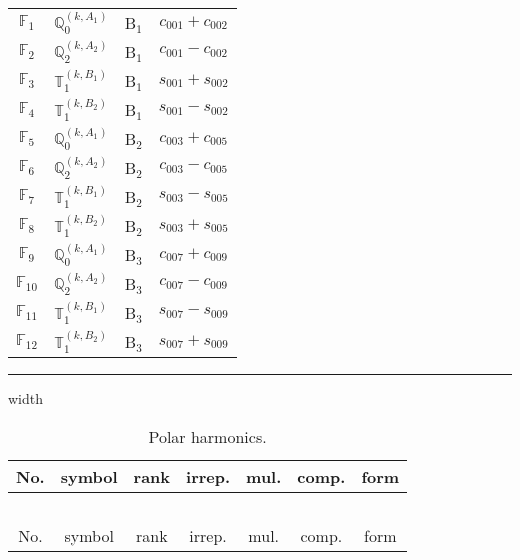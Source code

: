 \documentclass[fleqn,10pt,landscape]{article}
\begin{document}
\begin{itemize}
\begin{center}
\begin{longtable}{c|c|c|c}
$ \mathbb{F}_{1} $ & $\mathbb{Q}_{0}^{(k,A_{1})}$ & B$_{1}$ & $c_{001} + c_{002}$ \\
$ \mathbb{F}_{2} $ & $\mathbb{Q}_{2}^{(k,A_{2})}$ & B$_{1}$ & $c_{001} - c_{002}$ \\
$ \mathbb{F}_{3} $ & $\mathbb{T}_{1}^{(k,B_{1})}$ & B$_{1}$ & $s_{001} + s_{002}$ \\
$ \mathbb{F}_{4} $ & $\mathbb{T}_{1}^{(k,B_{2})}$ & B$_{1}$ & $s_{001} - s_{002}$ \\ \hline
$ \mathbb{F}_{5} $ & $\mathbb{Q}_{0}^{(k,A_{1})}$ & B$_{2}$ & $c_{003} + c_{005}$ \\
$ \mathbb{F}_{6} $ & $\mathbb{Q}_{2}^{(k,A_{2})}$ & B$_{2}$ & $c_{003} - c_{005}$ \\
$ \mathbb{F}_{7} $ & $\mathbb{T}_{1}^{(k,B_{1})}$ & B$_{2}$ & $s_{003} - s_{005}$ \\
$ \mathbb{F}_{8} $ & $\mathbb{T}_{1}^{(k,B_{2})}$ & B$_{2}$ & $s_{003} + s_{005}$ \\ \hline
$ \mathbb{F}_{9} $ & $\mathbb{Q}_{0}^{(k,A_{1})}$ & B$_{3}$ & $c_{007} + c_{009}$ \\
$ \mathbb{F}_{10} $ & $\mathbb{Q}_{2}^{(k,A_{2})}$ & B$_{3}$ & $c_{007} - c_{009}$ \\
$ \mathbb{F}_{11} $ & $\mathbb{T}_{1}^{(k,B_{1})}$ & B$_{3}$ & $s_{007} - s_{009}$ \\
$ \mathbb{F}_{12} $ & $\mathbb{T}_{1}^{(k,B_{2})}$ & B$_{3}$ & $s_{007} + s_{009}$ \\
\end{longtable}
\end{center}

 \hfil \hrule height 1mm width \textwidth \hfil

\begin{center}
\renewcommand{\arraystretch}{1.3}
\begin{longtable}{ccccccc}
\caption{Polar harmonics.}
 \\
 \hline \hline
No. & symbol & rank & irrep. & mul. & comp. & form \\ \hline \endfirsthead

\multicolumn{6}{l}{\tablename\ \thetable{}} \\
 \hline \hline
No. & symbol & rank & irrep. & mul. & comp. & form \\ \hline \endhead


\end{longtable}
\end{center}
\end{itemize}
\end{document}
